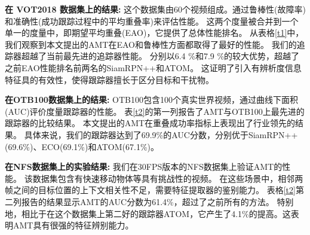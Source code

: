 \documentclass[promaster]{thesis-uestc}
\begin{document}
\textbf{在 VOT2018 数据集上的结果:}
这个数据集由60个视频组成。通过鲁棒性(故障率)和准确性(成功跟踪过程中的平均重叠率)来评估性能。
这两个度量被合并到一个单一的度量中，即期望平均重叠(EAO)，它提供了总体性能排名。
从表格\ref{t1}中，我们观察到本文提出的AMT在EAO和鲁棒性方面都取得了最好的性能。
我们的追踪器超越了当前最先进的追踪器性能。
分别以6.4 \%和7.9 \%的较大优势，超越了之前EAO性能排名前两名的SiamRPN++和ATOM。
这证明了引入有辨析度信息特征具的有效性，使得跟踪器擅长于区分目标和干扰物。

\begin{table}[htp!]
    \caption{在VOT2018数据集上就EAO、精度和鲁棒性性能指标与目前最先进的方法进行比较。
    我们用来对跟踪器进行评价排名的主要指标是EAO(期望平均重叠)。}
    \begin{center}
    \end{center}
    \label{t1}
\end{table}

\textbf{在OTB100数据集上的结果:} 
OTB100包含100个真实世界视频，通过曲线下面积(AUC)评价度量跟踪器的性能。
表\ref{t2}的第一列报告了AMT与OTB100上最先进的跟踪器的比较结果。
本文提出的AMT在重叠成功率指标上表现出了行业领先的结果。
具体来说，我们的跟踪器达到了69.9\%的AUC分数，分别优于SiamRPN++(69.6\%)、ECO(69.1\%)和ATOM(67.1\%)。


\textbf{在NFS数据集上的实验结果:}
我们在30FPS版本的NFS数据集上验证AMT的性能。
该数据集包含有快速移动物体等具有挑战性的视频。
在这些场景中，相邻两帧之间的目标位置的上下文相关性不足，需要特征提取器的鉴别能力。
表格\ref{t2}第二列报告的结果显示AMT的AUC分数为61.4\%，超过了之前所有的方法。
特别地，相比于在这个数据集上第二好的跟踪器ATOM，它产生了4.1\%的提高。这表明AMT具有很强的特征辨别能力。
\end{document}
